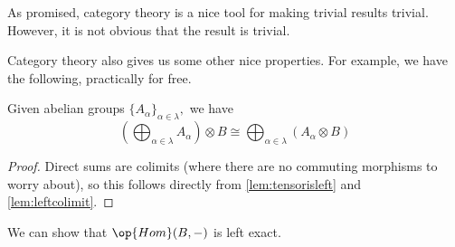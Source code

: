\begin{remark}
	As promised, category theory is a nice tool for making trivial results trivial. However, it is not obvious that the result is trivial.
\end{remark}
Category theory also gives us some other nice properties. For example, we have the following, practically for free.
\begin{proposition} \label{prop:tensorsums}
	Given abelian groups $\{A_\alpha\}_{\alpha\in\lambda},$ we have
	\[\left(\bigoplus_{\alpha\in\lambda}A_\alpha\right)\otimes B\cong\bigoplus_{\alpha\in\lambda}(A_\alpha\otimes B)\]
\end{proposition}
\begin{proof}
	Direct sums are colimits (where there are no commuting morphisms to worry about), so this follows directly from \autoref{lem:tensorisleft} and \autoref{lem:leftcolimit}.
\end{proof}
\begin{proposition}
	We can show that $\op{Hom}(B,-)$ is left exact.
\end{proposition}
